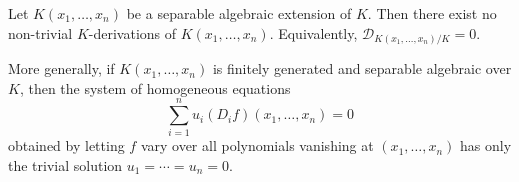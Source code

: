 Let $K(x_1, \ldots, x_n)$ be a separable algebraic extension of $K$. Then there exist no non-trivial $K$-derivations of $K(x_1, \ldots, x_n)$. Equivalently, $\mathcal{D}_{K(x_1, \ldots, x_n)/K} = 0$.

More generally, if $K(x_1, \ldots, x_n)$ is finitely generated and separable algebraic over $K$, then the system of homogeneous equations
$$\sum_{i=1}^n u_i (D_i f)(x_1, \ldots, x_n) = 0$$
obtained by letting $f$ vary over all polynomials vanishing at $(x_1, \ldots, x_n)$ has only the trivial solution $u_1 = \cdots = u_n = 0$.
